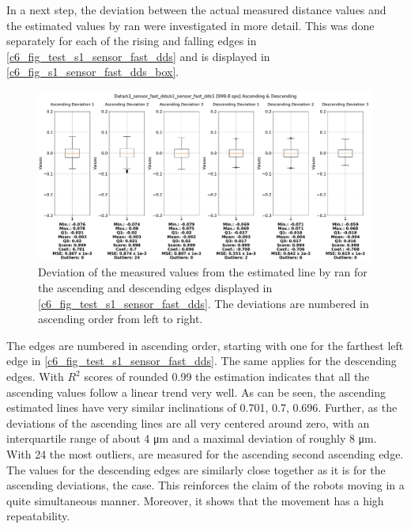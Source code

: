 In a next step, the deviation between the actual measured distance values and the estimated values by \gls{ran} were investigated in more detail. This was done separately for each of the rising and falling edges in \autoref{c6_fig_test_s1_sensor_fast_dds} and is displayed in \autoref{c6_fig_s1_sensor_fast_dds_box}.
\begin{figure}[H]
	\centering
	\includegraphics[width=1\textwidth]{Figures/c6/s1/s1_sensor_fast_dds_1_box_aio.pdf}
	\caption{Deviation of the measured values from the estimated line by \gls{ran} for the ascending and descending edges displayed in \autoref{c6_fig_test_s1_sensor_fast_dds}. The deviations are numbered in ascending order from left to right.}
	\label{c6_fig_s1_sensor_fast_dds_box}
\end{figure}
The edges are numbered in ascending order, starting with one for the farthest left edge in \autoref{c6_fig_test_s1_sensor_fast_dds}. The same applies for the descending edges. With $R^2$ scores of rounded 0.99 the estimation indicates that all the ascending values follow a linear trend very well. As can be seen, the ascending estimated lines have very similar inclinations of 0.701, 0.7, 0.696. Further, as the deviations of the ascending lines are all very centered around zero, with an interquartile range of about 4 \si{\micro\meter} and a maximal deviation of roughly 8 \si{\micro\meter}. With 24 the most outliers, are measured for the ascending second ascending edge. The values for the descending edges are similarly close together as it is for the ascending deviations, the case. This reinforces the claim of the robots moving in a quite simultaneous manner. Moreover, it shows that the movement has a high repeatability.
